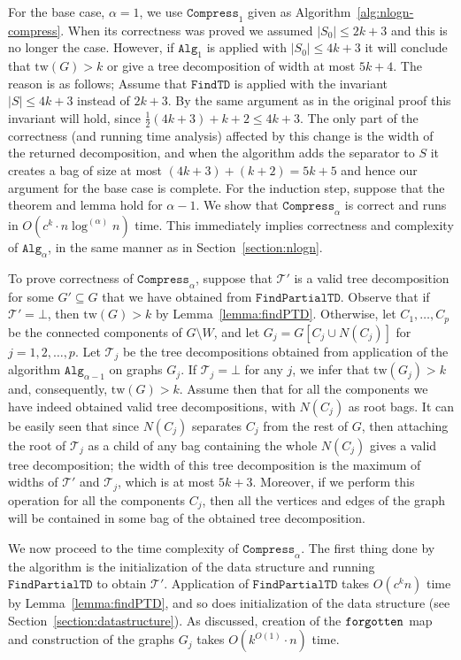 \documentclass[a4paper,11pt]{article}
\theoremstyle{definition}
\theoremstyle{remark}
\newcommand{\depth}{\alpha}
\newcommand{\findTD}{\mathtt{FindTD}}
\newcommand{\findPTD}{\mathtt{FindPartialTD}}
\newcommand{\compress}[1]{\mathtt{Compress}_{#1}}
\newcommand{\alg}[1]{\mathtt{Alg}_{#1}}
\newcommand{\false}{\bot}
\newcommand{\td}{\mathcal{T}} \newcommand{\tw}{\mathrm{tw}} \newcommand{\w}{\mathrm{w}}
\begin{document}
For the base case, $\depth = 1$, we use $\compress{1}$ given as
Algorithm~\ref{alg:nlogn-compress}.  When its correctness was proved
we assumed $|S_0| \leq 2k+3$ and this is no longer the case.  However,
if $\alg{1}$ is applied with $|S_0| \leq 4k+3$ it will conclude that
$\tw(G) > k$ or give a tree decomposition of width at most $5k+4$.
The reason is as follows; Assume that $\findTD$ is applied with the
invariant $|S| \leq 4k+3$ instead of $2k+3$.  By the same argument as
in the original proof this invariant will hold, since
$\frac{1}{2}(4k+3)+k+2 \leq 4k+3$.  The only part of the correctness
(and running time analysis) affected by this change is the width of
the returned decomposition, and when the algorithm adds the separator
to $S$ it creates a bag of size at most $(4k+3) + (k+2) = 5k+5$ and
hence our argument for the base case is complete.  For the induction
step, suppose that the theorem and lemma hold for $\depth - 1$.  We
show that $\compress{\depth}$ is correct and runs in $O(c^k \cdot n
\log^{(\depth)} n)$ time.  This immediately implies correctness and
complexity of $\alg{\depth}$, in the same manner as in
Section~\ref{section:nlogn}.





To prove correctness of $\compress{\depth}$, suppose that $\td'$ is a
valid tree decomposition for some $G' \subseteq G$ that we have
obtained from $\findPTD$.  Observe that if $\td'=\false$, then $\tw(G)
> k$ by Lemma~\ref{lemma:findPTD}.  Otherwise, let $C_1, \dots, C_p$
be the connected components of $G\setminus W$, and let $G_j=G[C_j\cup
N(C_j)]$ for $j=1,2,\ldots,p$.  Let $\td_j$ be the tree decompositions
obtained from application of the algorithm $\alg{\depth-1}$ on graphs
$G_j$.  If $\td_j=\bot$ for any $j$, we infer that $\tw(G_j)>k$ and,
consequently, $\tw(G)>k$.  Assume then that for all the components we
have indeed obtained valid tree decompositions, with $N(C_j)$ as root
bags.  It can be easily seen that since $N(C_j)$ separates $C_j$ from
the rest of $G$, then attaching the root of $\td_j$ as a child of any
bag containing the whole $N(C_j)$ gives a valid tree decomposition;
the width of this tree decomposition is the maximum of widths of
$\td'$ and $\td_j$, which is at most $5k+3$.  Moreover, if we perform
this operation for all the components $C_j$, then all the vertices and
edges of the graph will be contained in some bag of the obtained tree
decomposition.

We now proceed to the time complexity of $\compress{\depth}$.  The
first thing done by the algorithm is the initialization of the data
structure and running $\findPTD$ to obtain $\td'$.  Application of
$\findPTD$ takes $O(c^k n)$ time by Lemma~\ref{lemma:findPTD}, and so
does initialization of the data structure (see
Section~\ref{section:datastructure}).  As discussed, creation of the
$\texttt{forgotten}$ map and construction of the graphs $G_j$ takes
$O(k^{O(1)}\cdot n)$ time.
\end{document}

